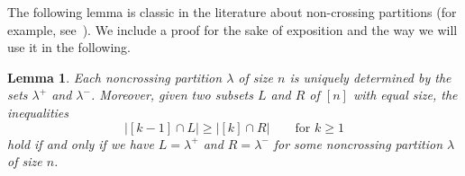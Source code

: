 \documentclass[12pt]{amsart}
\newtheorem{lem}[equation]{Lemma}
\theoremstyle{definition}
\theoremstyle{remark}
\numberwithin{equation}{section}
\begin{document}
The following lemma is classic in the literature about non-crossing partitions (for example, see~\cite{Stanley}). We include a proof for the sake of exposition and the way we will use it in the following.
\begin{lem}
\label{lem:noncrossingpartitionproperty}
Each noncrossing partition $\lambda$ of size $n$ is uniquely determined by the sets $\lambda^{+}$ and $\lambda^{-}$.  Moreover, given two subsets $L$ and $R$ of $[n]$ with equal size, the inequalities
\[
|[k-1] \cap L| \ge |[k] \cap R| \qquad\text{for $k \ge 1$}
\]
hold if and only if we have $L = \lambda^{+}$ and $R = \lambda^{-}$ for some noncrossing partition $\lambda$ of size $n$.
\end{lem}
\end{document}
